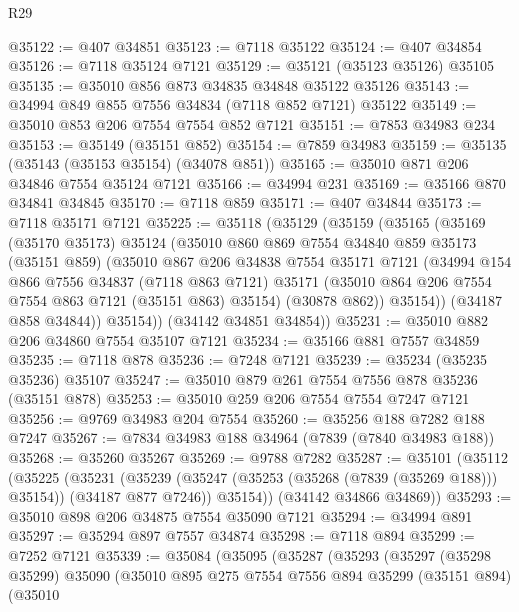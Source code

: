 \begin{lexlean}{R29}
\begin{coremodule}
@35122 := @407 @34851
@35123 := @7118 @35122
@35124 := @407 @34854
@35126 := @7118 @35124 @7121
@35129 := @35121 (@35123 @35126) @35105
@35135 := @35010 @856 @873 @34835 @34848 @35122 @35126
@35143 := @34994 @849 @855 @7556 @34834 (@7118 @852 @7121) @35122
@35149 := @35010 @853 @206 @7554 @7554 @852 @7121
@35151 := @7853 @34983 @234
@35153 := @35149 (@35151 @852)
@35154 := @7859 @34983
@35159 := @35135 (@35143 (@35153 @35154) (@34078 @851))
@35165 := @35010 @871 @206 @34846 @7554 @35124 @7121
@35166 := @34994 @231
@35169 := @35166 @870 @34841 @34845
@35170 := @7118 @859
@35171 := @407 @34844
@35173 := @7118 @35171 @7121
@35225 := @35118
    (@35129
      (@35159
        (@35165
          (@35169
            (@35170 @35173)
            @35124
            (@35010
              @860
              @869
              @7554
              @34840
              @859
              @35173
              (@35151 @859)
              (@35010
                @867
                @206
                @34838
                @7554
                @35171
                @7121
                (@34994
                  @154
                  @866
                  @7556
                  @34837
                  (@7118 @863 @7121)
                  @35171
                  (@35010 @864 @206 @7554 @7554 @863 @7121 (@35151 @863) @35154)
                  (@30878 @862))
                @35154))
            (@34187 @858 @34844))
          @35154))
      (@34142 @34851 @34854))
@35231 := @35010 @882 @206 @34860 @7554 @35107 @7121
@35234 := @35166 @881 @7557 @34859
@35235 := @7118 @878
@35236 := @7248 @7121
@35239 := @35234 (@35235 @35236) @35107
@35247 := @35010 @879 @261 @7554 @7556 @878 @35236 (@35151 @878)
@35253 := @35010 @259 @206 @7554 @7554 @7247 @7121
@35256 := @9769 @34983 @204 @7554
@35260 := @35256 @188 @7282 @188 @7247
@35267 := @7834 @34983 @188 @34964 (@7839 (@7840 @34983 @188))
@35268 := @35260 @35267
@35269 := @9788 @7282
@35287 := @35101
    (@35112
      (@35225
        (@35231
          (@35239 (@35247 (@35253 (@35268 (@7839 (@35269 @188))) @35154)) (@34187 @877 @7246))
          @35154))
      (@34142 @34866 @34869))
@35293 := @35010 @898 @206 @34875 @7554 @35090 @7121
@35294 := @34994 @891
@35297 := @35294 @897 @7557 @34874
@35298 := @7118 @894
@35299 := @7252 @7121
@35339 := @35084
    (@35095
      (@35287
        (@35293
          (@35297
            (@35298 @35299)
            @35090
            (@35010
              @895
              @275
              @7554
              @7556
              @894
              @35299
              (@35151 @894)
              (@35010

\end{coremodule}
\end{lexlean}
